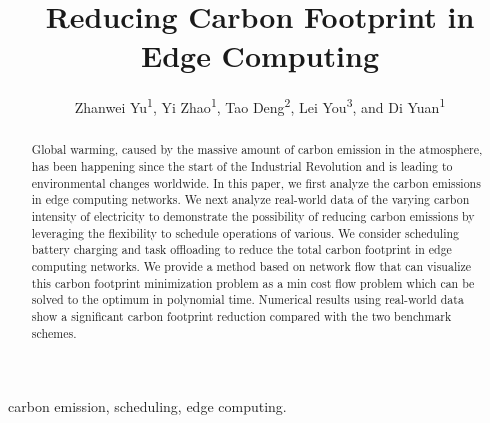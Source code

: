 \documentclass[conference, 10pt, ﬁnal, letterpaper, twocolumn]{IEEEtran}
\begin{document}
\title{Reducing Carbon Footprint in Edge Computing}
 
\author{Zhanwei Yu\textsuperscript{1}, Yi Zhao\textsuperscript{1}, Tao Deng\textsuperscript{2}, Lei You\textsuperscript{3}, and Di Yuan\textsuperscript{1}}


\renewcommand*{\Affilfont}{\small}

\maketitle

\begin{abstract}
Global warming, caused by the massive amount of carbon emission in the atmosphere, has been happening since the start of the Industrial Revolution and is leading to environmental changes worldwide. In this paper, we first analyze the carbon emissions in edge computing networks. We next analyze real-world data of the varying carbon intensity of electricity to demonstrate the possibility of reducing carbon emissions by leveraging the flexibility to schedule operations of various. We consider scheduling battery charging and task offloading to reduce the total carbon footprint in edge computing networks. We provide a method based on network flow that can visualize this carbon footprint minimization problem as a min cost flow problem which can be solved to the optimum in polynomial time. Numerical results using real-world data show a significant carbon footprint reduction compared with the two benchmark schemes.
\end{abstract}

\begin{IEEEkeywords}
carbon emission, scheduling, edge computing.
\end{IEEEkeywords}
\end{document}
